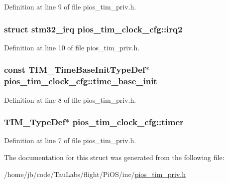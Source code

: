 \-Definition at line 9 of file pios\-\_\-tim\-\_\-priv.\-h.

\hypertarget{structpios__tim__clock__cfg_acb3841e388653b5ab1b67bfcc2418b33}{
\subsubsection[{irq2}]{\setlength{\rightskip}{0pt plus 5cm}struct {\bf stm32\-\_\-irq} {\bf pios\-\_\-tim\-\_\-clock\-\_\-cfg\-::irq2}}}\label{structpios__tim__clock__cfg_acb3841e388653b5ab1b67bfcc2418b33}


\-Definition at line 10 of file pios\-\_\-tim\-\_\-priv.\-h.

\hypertarget{structpios__tim__clock__cfg_abdc708ba1a22f20e3f31502ca32b2c13}{
\subsubsection[{time\-\_\-base\-\_\-init}]{\setlength{\rightskip}{0pt plus 5cm}const \-T\-I\-M\-\_\-\-Time\-Base\-Init\-Type\-Def$\ast$ {\bf pios\-\_\-tim\-\_\-clock\-\_\-cfg\-::time\-\_\-base\-\_\-init}}}\label{structpios__tim__clock__cfg_abdc708ba1a22f20e3f31502ca32b2c13}


\-Definition at line 8 of file pios\-\_\-tim\-\_\-priv.\-h.

\hypertarget{structpios__tim__clock__cfg_a537f6f4946bc2f5e188a9c3fec55647e}{
\subsubsection[{timer}]{\setlength{\rightskip}{0pt plus 5cm}\-T\-I\-M\-\_\-\-Type\-Def$\ast$ {\bf pios\-\_\-tim\-\_\-clock\-\_\-cfg\-::timer}}}\label{structpios__tim__clock__cfg_a537f6f4946bc2f5e188a9c3fec55647e}


\-Definition at line 7 of file pios\-\_\-tim\-\_\-priv.\-h.



\-The documentation for this struct was generated from the following file\-:\begin{DoxyCompactItemize}
\item 
/home/jb/code/\-Tau\-Labs/flight/\-Pi\-O\-S/inc/\hyperlink{pios__tim__priv_8h}{pios\-\_\-tim\-\_\-priv.\-h}\end{DoxyCompactItemize}
